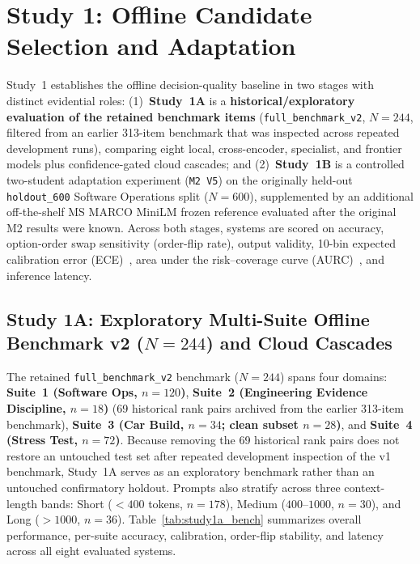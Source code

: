 \documentclass[11pt,a4paper]{article}
\begin{document}
\section{Study 1: Offline Candidate Selection and Adaptation}

Study~1 establishes the offline decision-quality baseline in two stages with distinct evidential roles: (1)~\textbf{Study~1A} is a \textbf{historical/exploratory evaluation of the retained benchmark items} (\texttt{full\_benchmark\_v2}, $N=244$, filtered from an earlier 313-item benchmark that was inspected across repeated development runs), comparing eight local, cross-encoder, specialist, and frontier models plus confidence-gated cloud cascades; and (2)~\textbf{Study~1B} is a controlled two-student adaptation experiment (\texttt{M2 V5}) on the originally held-out \texttt{holdout\_600} Software Operations split ($N=600$), supplemented by an additional off-the-shelf MS MARCO MiniLM frozen reference evaluated after the original M2 results were known. Across both stages, systems are scored on accuracy, option-order swap sensitivity (order-flip rate), output validity, 10-bin expected calibration error (ECE)~\cite{guo2017calibration}, area under the risk--coverage curve (AURC)~\cite{geifman2017selective}, and inference latency.

\subsection{Study 1A: Exploratory Multi-Suite Offline Benchmark v2 (\texorpdfstring{$N=244$}{N=244}) and Cloud Cascades}

The retained \texttt{full\_benchmark\_v2} benchmark ($N=244$) spans four domains: \textbf{Suite~1 (Software Ops, $n=120$)}, \textbf{Suite~2 (Engineering Evidence Discipline, $n=18$)} (69 historical rank pairs archived from the earlier 313-item benchmark), \textbf{Suite~3 (Car Build, $n=34$; clean subset $n=28$)}, and \textbf{Suite~4 (Stress Test, $n=72$)}. Because removing the 69 historical rank pairs does not restore an untouched test set after repeated development inspection of the v1 benchmark, Study~1A serves as an exploratory benchmark rather than an untouched confirmatory holdout. Prompts also stratify across three context-length bands: Short ($<400$ tokens, $n=178$), Medium ($400$--$1000$, $n=30$), and Long ($>1000$, $n=36$). Table~\ref{tab:study1a_bench} summarizes overall performance, per-suite accuracy, calibration, order-flip stability, and latency across all eight evaluated systems.
\end{document}
